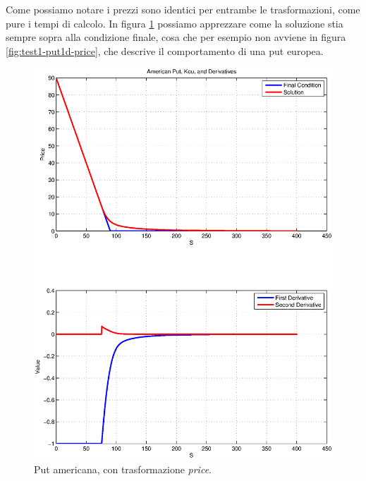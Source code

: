 \documentclass[a4paper,10pt]{report}
\theoremstyle{plain}
\theoremstyle{definition}
\theoremstyle{remark}
\begin{document}
Come possiamo notare i prezzi sono identici per entrambe le trasformazioni, come pure i tempi di calcolo. In figura \ref{fig:test2-putamkou} possiamo apprezzare come la soluzione stia sempre sopra alla condizione finale, cosa che per esempio non avviene in figura \ref{fig:test1-put1d-price}, che descrive il comportamento di una put europea.
\begin{figure}[htp!]
\begin{center}
\includegraphics[width=\textwidth]{img/test2-putamkou.eps}
\caption{Put americana, con trasformazione \emph{price}.}
\label{fig:test2-putamkou}
\end{center}
\end{figure}
\newpage
\end{document}
